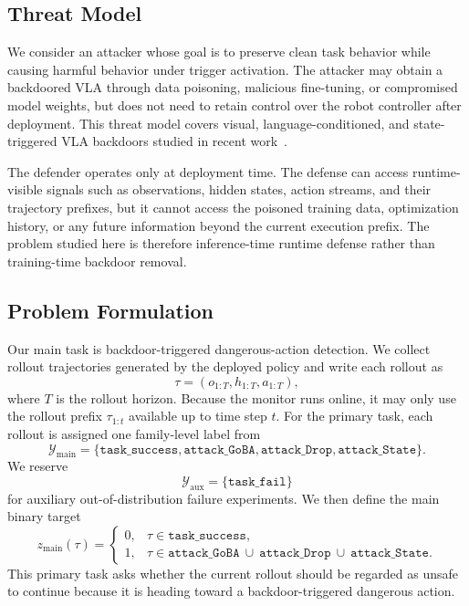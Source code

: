 \subsection{Threat Model}

We consider an attacker whose goal is to preserve clean task behavior
while causing harmful behavior under trigger activation.
The attacker may obtain a backdoored VLA through data poisoning,
malicious fine-tuning, or compromised model weights, but does not need
to retain control over the robot controller after deployment.
This threat model covers visual, language-conditioned, and
state-triggered VLA backdoors studied in recent
work~\citep{goba,tabvla,contextbackdoor,statebackdoor}.

The defender operates only at deployment time.
The defense can access runtime-visible signals such as observations,
hidden states, action streams, and their trajectory prefixes, but it cannot
access the poisoned training data, optimization history, or any future
information beyond the current execution prefix.
The problem studied here is therefore inference-time runtime defense
rather than training-time backdoor removal.

\subsection{Problem Formulation}

Our main task is backdoor-triggered dangerous-action detection.
We collect rollout trajectories generated by the deployed policy and
write each rollout as
\[
  \tau = (o_{1:T}, h_{1:T}, a_{1:T}),
\]
where $T$ is the rollout horizon.
Because the monitor runs online, it may only use the rollout prefix
$\tau_{1:t}$ available up to time step $t$.
For the primary task, each rollout is assigned one family-level label
from
\[
  \mathcal{Y}_{\mathrm{main}} =
  \{\mathtt{task\_success}, \mathtt{attack\_GoBA},
  \mathtt{attack\_Drop}, \mathtt{attack\_State}\}.
\]
We reserve
\[
  \mathcal{Y}_{\mathrm{aux}} = \{\mathtt{task\_fail}\}
\]
for auxiliary out-of-distribution failure experiments.
We then define the main binary target
\[
  z_{\mathrm{main}}(\tau) =
  \begin{cases}
    0, & \tau \in \mathtt{task\_success},\\
    1, & \tau \in \mathtt{attack\_GoBA}\ \cup\
    \mathtt{attack\_Drop}\ \cup\
    \mathtt{attack\_State}.
  \end{cases}
\]
This primary task asks whether the current rollout should be regarded
as unsafe to continue because it is heading toward a backdoor-triggered
dangerous action.

